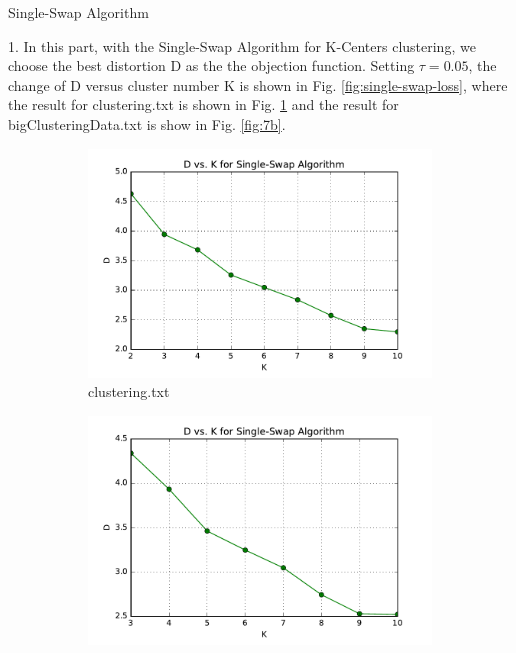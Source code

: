 \begin{description}
\begin{description}
\end{description}

\newpage
\item[(\Romannum{3}).] Single-Swap Algorithm

\begin{description}
\item{1.} In this part, with the Single-Swap Algorithm for K-Centers clustering, we choose the best distortion D as the the objection function. Setting $\tau = 0.05$, the change of D versus cluster number K is shown in Fig. \ref{fig:single-swap-loss}, where the result for clustering.txt is shown in Fig. \ref{fig:7a} and the result for bigClusteringData.txt is show in Fig. \ref{fig:7b}.

\begin{figure}[H]
\centering
\centering
        \begin{subfigure}[b]{0.49\textwidth}
            \centering
            \includegraphics[width=\textwidth]{./figures/loss_clustering_singleSwap.pdf}
            \caption{clustering.txt}\label{fig:7a}
        \end{subfigure}
        \hfill
        \begin{subfigure}[b]{0.49\textwidth}  
            \centering 
            \includegraphics[width=\textwidth]{./figures/loss_bigClustering_singleSwap.pdf}

\end{subfigure}
\end{figure}
\end{description}
\end{description}
